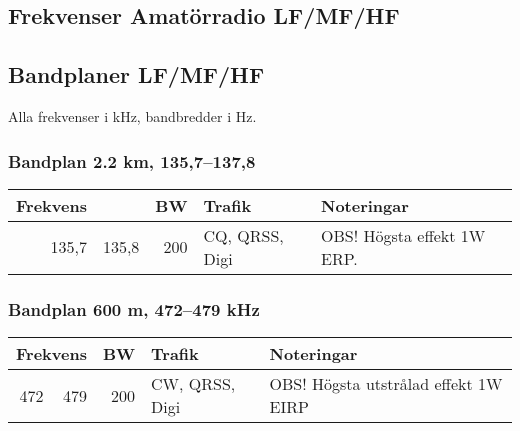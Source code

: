 \begin{landscape}

\section{Frekvenser Amatörradio LF/MF/HF}


\subsection{Bandplaner LF/MF/HF}
Alla frekvenser i kHz, bandbredder i Hz.

\subsubsection{Bandplan 2.2 km, 135,7--137,8}
\begin{tabular}{rrrll}
\textbf{Frekvens} &  & \textbf{BW} & \textbf{Trafik} & \textbf{Noteringar} \\ \hline
135,7 & 135,8 & 200 & CQ, QRSS, Digi & OBS! Högsta effekt 1W ERP. \\ \hline
\end{tabular}

\subsubsection{Bandplan 600 m, 472--479 kHz}
\begin{tabular}{rrrll}
\multicolumn{2}{c}{\textbf{Frekvens}} & \textbf{BW} & \textbf{Trafik} & \textbf{Noteringar} \\ \hline
472 & 479 & 200 & CW, QRSS, Digi & OBS! Högsta utstrålad effekt 1W EIRP \\ \hline
\end{tabular}


\end{landscape}
